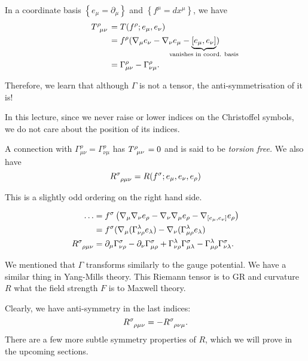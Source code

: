 In a coordinate basis $\left\{ e_\mu = \partial_\mu \right\} $ and $\left\{ f^\mu = dx^\mu \right\}$, we have
\begin{align}
  T \indices{^\rho_\mu_\nu} &= T(f^\rho; e_\mu, e_\nu) \\
			    &= f^\rho (\nabla_{\mu} e_\nu - \nabla_{\nu} e_\mu - \underbrace{[e_\mu, e_\nu]}_{\mathclap{\text{vanishes in coord. basis}}}) \\
			    &= \Gamma^\rho_{\mu\nu} - \Gamma^\rho_{\nu\mu}.
\end{align}
\begin{leftbar}
  \begin{remark}
    Therefore, we learn that although $\Gamma$ is not a tensor, the anti-symmetrisation of it is!
  \end{remark}
\end{leftbar}
\begin{leftbar}
  \begin{remark}
    In this lecture, since we never raise or lower indices on the Christoffel symbols, we do not care about the position of its indices.
  \end{remark}
\end{leftbar}
A connection with $\Gamma^\rho_{\mu\nu} = \Gamma^\rho_{\nu\mu}$ has $T \indices{^\rho_\mu_\nu} = 0$ and is said to be \emph{torsion free.}
We also have
\begin{equation}
  R \indices{^\sigma_\rho_\mu_\nu} = R (f^\sigma; e_\mu, e_\nu, e_\rho)
\end{equation}
\begin{leftbar}
  \begin{remark}
    This is a slightly odd ordering on the right hand side.
  \end{remark}
\end{leftbar}
\begin{align}
  \dots &= f^\sigma \left( \nabla_{\mu} \nabla_{\nu} e_\rho - \nabla_{\nu} \nabla_{\mu} e_\rho - \nabla_{[e_\mu, e_\nu]} e_\rho \right) \\
	&= f^\sigma (\nabla_{\mu} (\Gamma^\lambda_{\nu\rho} e_\lambda) - \nabla_{\nu} (\Gamma^\lambda_{\mu\rho} e_\lambda) \\
  R\indices{^{\sigma}_{\rho\mu\nu}} &=\partial_\mu \Gamma^\sigma_{\nu\rho} - \partial_\nu \Gamma^\sigma_{\mu\rho} + \Gamma^\lambda_{\nu\rho} \Gamma^\sigma_{\mu\lambda} - \Gamma^\lambda_{\mu\rho} \Gamma^\sigma_{\nu\lambda}.
\end{align}
\begin{leftbar}
  \begin{remark}
    We mentioned that $\Gamma$ transforms similarly to the gauge potential. We have a similar thing in Yang-Mills theory. This Riemann tensor is to GR and curvature $R$ what the field strength $F$ is to Maxwell theory.
  \end{remark}
\end{leftbar}
Clearly, we have anti-symmetry in the last indices:
\begin{equation}
  R \indices{^\sigma_\rho_\mu_\nu} = -R \indices{^\sigma_\rho_\nu_\mu}.
\end{equation}
There are a few more subtle symmetry properties of $R$, which we will prove in the upcoming sections.

